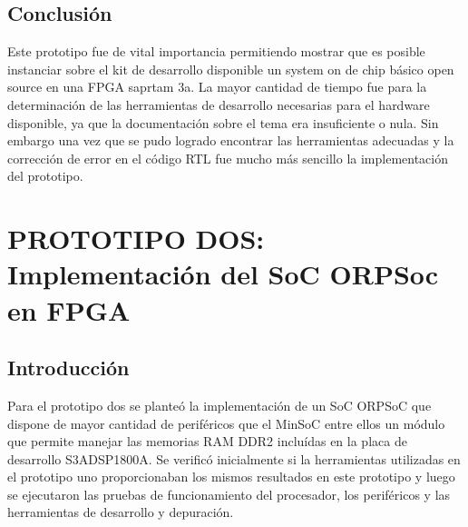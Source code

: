	
		\subsection{Conclusión}
Este prototipo fue de vital importancia permitiendo mostrar que es posible instanciar sobre el kit de desarrollo disponible un system on de chip básico open source en una FPGA saprtam 3a.
La mayor cantidad de tiempo fue para la  determinación de las herramientas de desarrollo necesarias para el hardware disponible, ya que la documentación sobre el tema era insuficiente o nula. Sin embargo una vez que se pudo logrado encontrar las herramientas adecuadas y  la corrección de error en el código RTL fue mucho más sencillo la implementación del prototipo.
		
\newpage


		
	\section{PROTOTIPO DOS: Implementación del SoC ORPSoc en FPGA}
		\subsection{Introducción}
		Para el prototipo dos se planteó la implementación de un SoC ORPSoC que dispone de mayor cantidad de periféricos que el MinSoC entre ellos un módulo
		que permite manejar las memorias RAM DDR2 incluídas en la placa de desarrollo S3ADSP1800A. Se verificó inicialmente si la herramientas utilizadas en
		el prototipo uno proporcionaban los mismos resultados en este prototipo y luego se ejecutaron las pruebas de funcionamiento del procesador, los
		periféricos y las herramientas de desarrollo y depuración. 
		

